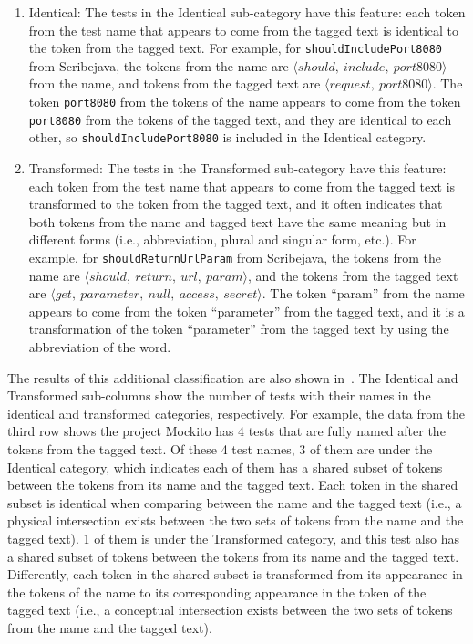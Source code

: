 \begin{enumerate}
\item Identical: The tests in the Identical sub-category have this feature: each token from the test name that appears to come from the tagged text is identical to the token from the tagged text.
%
For example, for \texttt{should\-Include\-Port8080} from Scribejava, the tokens from the name are $\langle should,~include,~port8080 \rangle$ from the name, and tokens from the tagged text are $\langle request,~port8080 \rangle$.
%
The token \texttt{port8080} from the tokens of the name appears to come from the token \texttt{port8080} from the tokens of the tagged text, and they are identical to each other, so \texttt{should\-Include\-Port8080} is included in the Identical category.

\item Transformed: The tests in the Transformed sub-category have this feature: each token from the test name that appears to come from the tagged text is transformed to the token from the tagged text, and it often indicates that both tokens from the name and tagged text have the same meaning but in different forms (i.e., abbreviation, plural and singular form, etc.).
%
For example, for \texttt{should\-Return\-Url\-Param} from Scribejava, the tokens from the name are $\langle should,~return,~url,~param \rangle$, and the tokens from the tagged text are $\langle get,~parameter,~null,~access,~secret \rangle$.
%
The token \enquote{param} from the name appears to come from the token \enquote{parameter} from the tagged text, and it is a transformation of the token \enquote{parameter} from the tagged text by using the abbreviation of the word.
\end{enumerate}


The results of this additional classification are also shown in~.
%
The Identical and Transformed sub-columns show the number of tests with their names in the identical and transformed categories, respectively.
%
For example, the data from the third row shows the project Mockito has \num{4} tests that are fully named after the tokens from the tagged text.
%
Of these \num{4} test names, \num{3} of them are under the Identical category, which indicates each of them has a shared subset of tokens between the tokens from its name and the tagged text.
%
Each token in the shared subset is identical when comparing between the name and the tagged text (i.e., a physical intersection exists between the two sets of tokens from the name and the tagged text).
%
\num{1} of them is under the Transformed category, and this test also has a shared subset of tokens between the tokens from its name and the tagged text.
%
Differently, each token in the shared subset is transformed from its appearance in the tokens of the name to its corresponding appearance in the token of the tagged text (i.e., a conceptual intersection exists between the two sets of tokens from the name and the tagged text).

